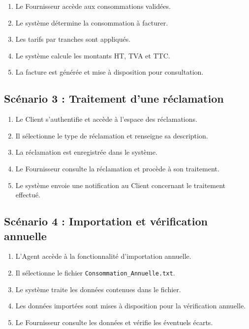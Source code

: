 \begin{enumerate}[leftmargin=*]
    \item Le Fournisseur accède aux consommations validées.
    \item Le système détermine la consommation à facturer.
    \item Les tarifs par tranches sont appliqués.
    \item Le système calcule les montants HT, TVA et TTC.
    \item La facture est générée et mise à disposition pour consultation.
\end{enumerate}

\subsection*{Scénario 3 : Traitement d'une réclamation}

\begin{enumerate}[leftmargin=*]
    \item Le Client s'authentifie et accède à l'espace des réclamations.
    \item Il sélectionne le type de réclamation et renseigne sa description.
    \item La réclamation est enregistrée dans le système.
    \item Le Fournisseur consulte la réclamation et procède à son traitement.
    \item Le système envoie une notification au Client concernant le traitement effectué.
\end{enumerate}

\subsection*{Scénario 4 : Importation et vérification annuelle}

\begin{enumerate}[leftmargin=*]
    \item L'Agent accède à la fonctionnalité d'importation annuelle.
    \item Il sélectionne le fichier \texttt{Consommation\_Annuelle.txt}.
    \item Le système traite les données contenues dans le fichier.
    \item Les données importées sont mises à disposition pour la vérification annuelle.
    \item Le Fournisseur consulte les données et vérifie les éventuels écarts.
\end{enumerate}

